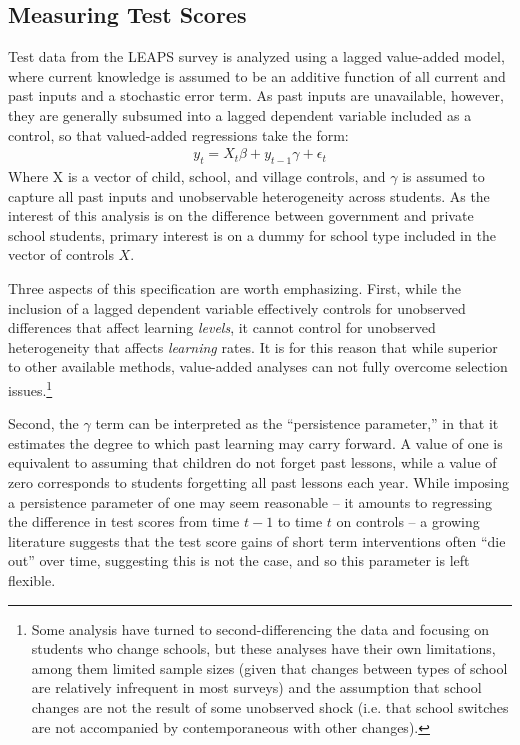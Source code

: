 \documentclass[12pt]{article}
\begin{document}
\subsection{Measuring Test Scores}\label{}

Test data from the LEAPS survey is analyzed using a lagged value-added model, where current knowledge is assumed to be an additive function of all current and past inputs and a stochastic error term. As past inputs are unavailable, however, they are generally subsumed into a lagged dependent variable included as a control, so that valued-added regressions take the form:
\begin{eqnarray*}
	y_{t}=X_t\beta+y_{t-1}\gamma + \epsilon_t
\end{eqnarray*}
Where X is a vector of child, school, and village controls, and $\gamma$ is assumed to capture all past inputs and unobservable heterogeneity across students. As the interest of this analysis is on the difference between government and private school students, primary interest is on a dummy for school type included in the vector of controls $X$. 

Three aspects of this specification are worth emphasizing. First, while the inclusion of a lagged dependent variable effectively controls for unobserved differences that affect learning \emph{levels}, it cannot control for unobserved heterogeneity that affects \emph{learning} rates. It is for this reason that while superior to other available methods, value-added analyses can not fully overcome selection issues.\footnote{Some analysis have turned to second-differencing the data and focusing on students who change schools, but these analyses have their own limitations, among them limited sample sizes (given that changes between types of school are relatively infrequent in most surveys) and the assumption that school changes are not the result of some unobserved shock (i.e. that school switches are not accompanied by contemporaneous with other changes).}

Second, the $\gamma$ term can be interpreted as the ``persistence parameter,'' in that it estimates the degree to which past learning may carry forward. A value of one is equivalent to assuming that children do not forget past lessons, while a value of zero corresponds to students forgetting all past lessons each year. While imposing a persistence parameter of one may seem reasonable -- it amounts to regressing the difference in test scores from time $t-1$ to time $t$ on controls -- a growing literature suggests that the test score gains of short term interventions often ``die out'' over time, suggesting this is not the case\citep{Glewwe:2010hj,Currie:1995wo,Andrabi:2011hl}, and so this parameter is left flexible. 
\end{document}
